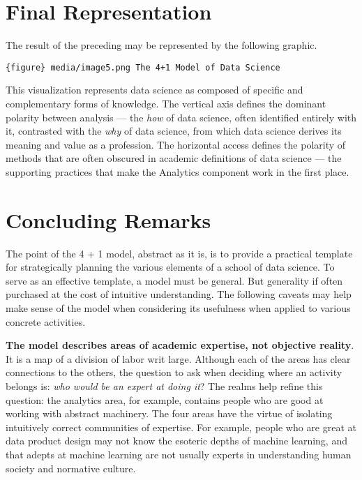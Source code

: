 \documentclass[
  letterpaper,
  DIV=11,
  numbers=noendperiod]{scrreprt}
\begin{document}
\hypertarget{final-representation}{%
\section{Final Representation}\label{final-representation}}

The result of the preceding may be represented by the following graphic.

\texttt{\{figure\}\ media/image5.png\ The\ 4+1\ Model\ of\ Data\ Science}

This visualization represents data science as composed of specific and
complementary forms of knowledge. The vertical axis defines the dominant
polarity between analysis --- the \emph{how} of data science, often
identified entirely with it, contrasted with the \emph{why} of data
science, from which data science derives its meaning and value as a
profession. The horizontal access defines the polarity of methods that
are often obscured in academic definitions of data science --- the
supporting practices that make the Analytics component work in the first
place.

\hypertarget{concluding-remarks}{%
\section{Concluding Remarks}\label{concluding-remarks}}

The point of the 4 + 1 model, abstract as it is, is to provide a
practical template for strategically planning the various elements of a
school of data science. To serve as an effective template, a model must
be general. But generality if often purchased at the cost of intuitive
understanding. The following caveats may help make sense of the model
when considering its usefulness when applied to various concrete
activities.

\textbf{The model describes areas of academic expertise, not objective
reality}. It is a map of a division of labor writ large. Although each
of the areas has clear connections to the others, the question to ask
when deciding where an activity belongs is: \emph{who would be an expert
at doing it}? The realms help refine this question: the analytics area,
for example, contains people who are good at working with abstract
machinery. The four areas have the virtue of isolating intuitively
correct communities of expertise. For example, people who are great at
data product design may not know the esoteric depths of machine
learning, and that adepts at machine learning are not usually experts in
understanding human society and normative culture.
\end{document}
